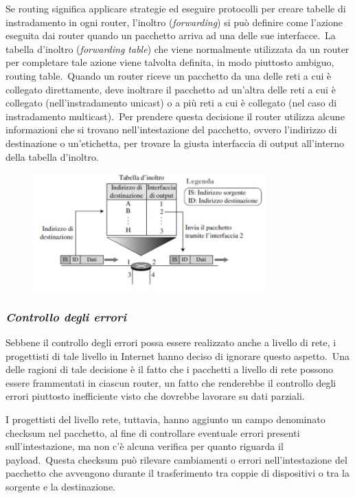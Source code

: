 Se routing significa applicare strategie ed eseguire protocolli per creare tabelle di instradamento in ogni router, l'inoltro (\emph{forwarding}) si può definire come l'azione eseguita dai router quando un pacchetto arriva ad una delle sue interfacce.\
La tabella d'inoltro (\emph{forwarding table}) che viene normalmente utilizzata da un router per completare tale azione viene talvolta definita, in modo piuttosto ambiguo, routing table.\
Quando un router riceve un pacchetto da una delle reti a cui è collegato direttamente, deve inoltrare il pacchetto ad un'altra delle reti a cui è collegato (nell'instradamento unicast) o a più reti a cui è collegato (nel caso di instradamento multicast).\
Per prendere questa decisione il router utilizza alcune informazioni che si trovano nell'intestazione del pacchetto, ovvero l'indirizzo di destinazione o un'etichetta, per trovare la giusta interfaccia di output all'interno della tabella d'inoltro.

\begin{figure}[H]
    \centering
    \includegraphics[width = 0.8\textwidth]{immagini/Forwarding.jpg}
\end{figure}

\subsubsection{\emph{Controllo degli errori}}

Sebbene il controllo degli errori possa essere realizzato anche a livello di rete, i progettisti di tale livello in Internet hanno deciso di ignorare questo aspetto.\
Una delle ragioni di tale decisione è il fatto che i pacchetti a livello di rete possono essere frammentati in ciascun router, un fatto che renderebbe il controllo degli errori piuttosto inefficiente visto che dovrebbe lavorare su dati parziali.

I progettisti del livello rete, tuttavia, hanno aggiunto un campo denominato checksum nel pacchetto, al fine di controllare eventuale errori presenti sull'intestazione, ma non c'è alcuna verifica per quanto riguarda il payload.\
Questa checksum può rilevare cambiamenti o errori nell'intestazione del pacchetto che avvengono durante il trasferimento tra coppie di dispositivi o tra la sorgente e la destinazione.

